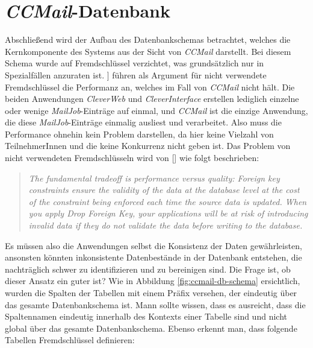 \section{\emph{CCMail}-Datenbank}
\label{sec:ccmail-datanbank}
Abschließend wird der Aufbau des Datenbankschemas betrachtet, welches die Kernkomponente des Systems aus der Sicht von \emph{CCMail} darstellt. Bei diesem Schema wurde auf Fremdschlüssel verzichtet, was grundsätzlich nur in Spezialfällen anzuraten ist.
\newline
\newline 
[\cite[213]{refactoreDatabase}] führen als Argument für nicht verwendete Fremdschlüssel die Performanz an, welches im Fall von \emph{CCMail} nicht hält. Die beiden Anwendungen \emph{CleverWeb} und \emph{CleverInterface} erstellen lediglich einzelne oder wenige \emph{MailJob}-Einträge auf einmal, und \emph{CCMail} ist die einzige Anwendung, die diese \emph{MailJob}-Einträge einmalig ausliest und verarbeitet. Also muss die Performance ohnehin kein Problem darstellen, da hier keine Vielzahl von TeilnehmerInnen und die keine Konkurrenz nicht geben ist. Das Problem von nicht verwendeten Fremdschlüsseln wird von [\cite[213]{refactoreDatabase}] wie folgt beschrieben:
\newpage
\begin{quote}
\emph{The fundamental tradeoff is performance versus quality: Foreign key constraints ensure the validity of the data at the database level at the cost of the constraint being enforced each time the source data is updated. When you apply Drop Foreign Key, your applications will be at risk of introducing invalid data if they do not validate the data before writing to the database.}
\end{quote}
Es müssen also die Anwendungen selbst die Konsistenz der Daten gewährleisten, ansonsten könnten inkonsistente Datenbestände in der Datenbank entstehen, die nachträglich schwer zu identifizieren und zu bereinigen sind. Die Frage ist, ob dieser Ansatz ein guter ist?
\newline
\newline
Wie in Abbildung \ref{fig:ccmail-db-schema} ersichtlich, wurden die Spalten der Tabellen mit einem Präfix versehen, der eindeutig über das gesamte Datenbankschema ist. Mann sollte wissen, dass es ausreicht, dass die Spaltennamen eindeutig innerhalb des Kontexts einer Tabelle sind und nicht global über das gesamte Datenbankschema. Ebenso erkennt man, dass folgende Tabellen Fremdschlüssel definieren: 
